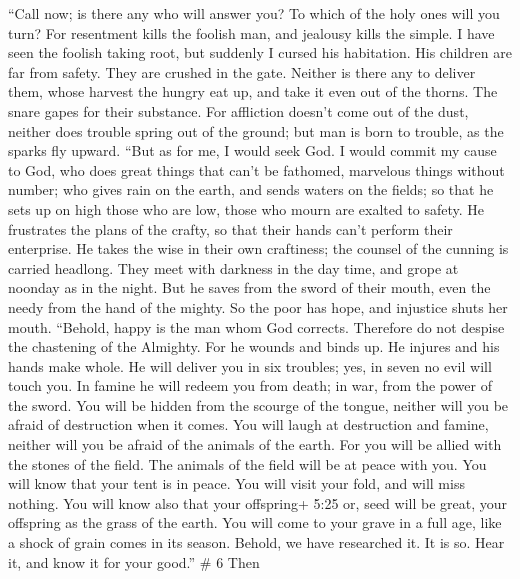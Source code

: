  ``Call now; is there any who will answer you? To which of
the holy ones will you turn?  For resentment kills the
foolish man, and jealousy kills the simple.  I have seen the
foolish taking root, but suddenly I cursed his habitation. 
His children are far from safety. They are crushed in the gate. Neither
is there any to deliver them,  whose harvest the hungry eat
up, and take it even out of the thorns. The snare gapes for their
substance.  For affliction doesn't come out of the dust,
neither does trouble spring out of the ground;  but man is
born to trouble, as the sparks fly upward.  ``But as for me,
I would seek God. I would commit my cause to God,  who does
great things that can't be fathomed, marvelous things without number;
 who gives rain on the earth, and sends waters on the
fields;  so that he sets up on high those who are low,
those who mourn are exalted to safety.  He frustrates the
plans of the crafty, so that their hands can't perform their enterprise.
 He takes the wise in their own craftiness; the counsel of
the cunning is carried headlong.  They meet with darkness
in the day time, and grope at noonday as in the night.  But
he saves from the sword of their mouth, even the needy from the hand of
the mighty.  So the poor has hope, and injustice shuts her
mouth.  ``Behold, happy is the man whom God corrects.
Therefore do not despise the chastening of the Almighty. 
For he wounds and binds up. He injures and his hands make whole.
 He will deliver you in six troubles; yes, in seven no evil
will touch you.  In famine he will redeem you from death;
in war, from the power of the sword.  You will be hidden
from the scourge of the tongue, neither will you be afraid of
destruction when it comes.  You will laugh at destruction
and famine, neither will you be afraid of the animals of the earth.
 For you will be allied with the stones of the field. The
animals of the field will be at peace with you.  You will
know that your tent is in peace. You will visit your fold, and will miss
nothing.  You will know also that your offspring+ 5:25 or,
seed will be great, your offspring as the grass of the earth.
 You will come to your grave in a full age, like a shock of
grain comes in its season.  Behold, we have researched it.
It is so. Hear it, and know it for your good.'' \# 6  Then

